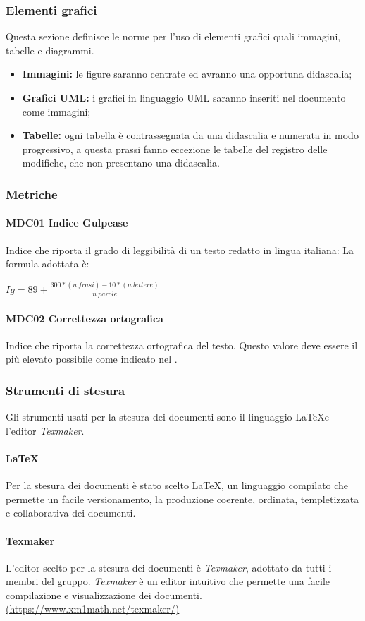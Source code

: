 \subsubsection{Elementi grafici}
Questa sezione definisce le norme per l'uso di elementi grafici quali immagini, tabelle e diagrammi.
\begin{itemize}
\item \textbf{Immagini:} le figure saranno centrate ed avranno una opportuna didascalia;
\item \textbf{Grafici UML:} i grafici in linguaggio UML saranno inseriti nel documento come immagini;
\item \textbf{Tabelle:} ogni tabella è contrassegnata da una didascalia e numerata in modo progressivo, a questa prassi fanno eccezione le tabelle del registro delle modifiche, che non presentano una didascalia.
\end{itemize}
\subsubsection{Metriche}
\paragraph{MDC01 Indice Gulpease}
Indice che riporta il grado di leggibilità di un testo redatto in lingua italiana:
La formula adottata è:\newline
\centerline{\textbf{$Ig= 89 + \frac{300 * (n\ frasi) - 10 * (n\ lettere)}{n\ parole}$}}
\paragraph{MDC02 Correttezza ortografica}
Indice che riporta la correttezza ortografica del testo. Questo valore deve essere il più elevato possibile come indicato nel \PdQ{}.

\subsubsection{Strumenti di stesura}
Gli strumenti usati per la stesura dei documenti sono il linguaggio \LaTeX e l'editor \textit{Texmaker}.
\paragraph{\LaTeX}
Per la stesura dei documenti è stato scelto \LaTeX, un linguaggio compilato che permette un facile versionamento, la produzione coerente, ordinata, templetizzata e collaborativa dei documenti.
\paragraph{Texmaker}
L'editor scelto per la stesura dei documenti è \textit{Texmaker}, adottato da tutti i membri del gruppo. \textit{Texmaker} è un editor intuitivo che permette una facile compilazione e visualizzazione dei documenti.\newline
\url{(https://www.xm1math.net/texmaker/)}

